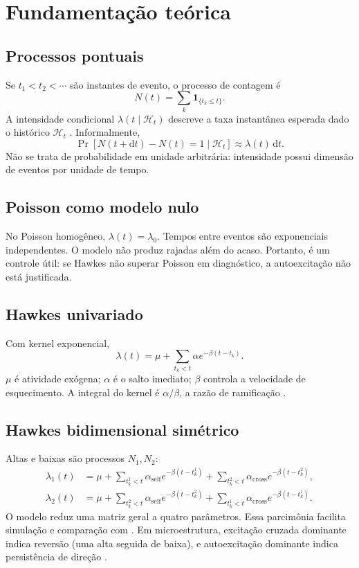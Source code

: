 \documentclass[12pt,a4paper,openany]{report}
\begin{document}
\chapter{Fundamentação teórica}

\section{Processos pontuais}

Se \(t_1<t_2<\cdots\) são instantes de evento, o processo de contagem é
\[
  N(t)=\sum_k\mathbf{1}_{\{t_k\le t\}}.
\]
A intensidade condicional \(\lambda(t\mid\mathcal H_t)\) descreve a taxa instantânea
esperada dado o histórico \(\mathcal H_t\) \citep{daley2003}. Informalmente,
\[
  \Pr[N(t+\mathrm dt)-N(t)=1\mid\mathcal H_t]
  \approx \lambda(t)\,\mathrm dt.
\]
Não se trata de probabilidade em unidade arbitrária: intensidade possui dimensão de
eventos por unidade de tempo.

\section{Poisson como modelo nulo}

No Poisson homogêneo, \(\lambda(t)=\lambda_0\). Tempos entre eventos são exponenciais
independentes. O modelo não produz rajadas além do acaso. Portanto, é um controle útil:
se Hawkes não superar Poisson em diagnóstico, a autoexcitação não está justificada.

\section{Hawkes univariado}

Com kernel exponencial,
\[
  \lambda(t)=\mu+\sum_{t_k<t}\alpha e^{-\beta(t-t_k)}.
\]
\(\mu\) é atividade exógena; \(\alpha\) é o salto imediato; \(\beta\) controla a
velocidade de esquecimento. A integral do kernel é \(\alpha/\beta\), a razão de
ramificação \citep{laub2021}.

\section{Hawkes bidimensional simétrico}

Altas e baixas são processos \(N_1,N_2\):
\begin{align}
\lambda_1(t)&=\mu+\sum_{t_k^1<t}\alpha_{\mathrm{self}}e^{-\beta(t-t_k^1)}
 +\sum_{t_k^2<t}\alpha_{\mathrm{cross}}e^{-\beta(t-t_k^2)},\\
\lambda_2(t)&=\mu+\sum_{t_k^2<t}\alpha_{\mathrm{self}}e^{-\beta(t-t_k^2)}
 +\sum_{t_k^1<t}\alpha_{\mathrm{cross}}e^{-\beta(t-t_k^1)}.
\end{align}
O modelo reduz uma matriz geral a quatro parâmetros. Essa parcimônia facilita
simulação e comparação com \citet{lee2023}. Em microestrutura, excitação cruzada
dominante indica reversão (uma alta seguida de baixa), e autoexcitação dominante
indica persistência de direção \citep{bacry2013}.
\end{document}
